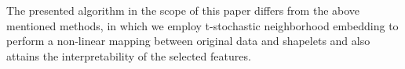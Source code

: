 
The presented algorithm in the scope of this paper differs from the above mentioned methods, in which we employ t-stochastic neighborhood embedding to perform a non-linear mapping between original data and shapelets and also attains the interpretability of the selected features.
